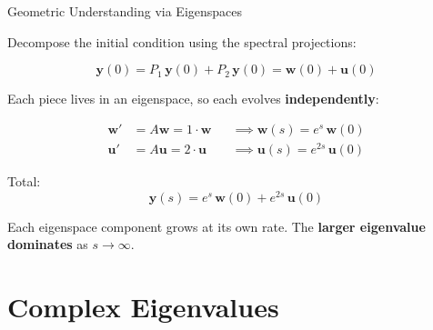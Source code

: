 \documentclass[10pt]{beamer}
\theoremstyle{definition}
\newcommand{\x}[1]{\alert{\textbf{#1}}}
\begin{document}
\begin{frame}{Geometric Understanding via Eigenspaces}

Decompose the initial condition using the spectral projections:

$$\mathbf{y}(0) = P_1\,\mathbf{y}(0) + P_2\,\mathbf{y}(0) = \mathbf{w}(0) + \mathbf{u}(0)$$

\vfill\pause

Each piece lives in an eigenspace, so each evolves \x{independently}:

\vfill

\begin{align*}
\mathbf{w}' &= A\mathbf{w} = 1 \cdot \mathbf{w} &&\implies \mathbf{w}(s) = e^{s}\,\mathbf{w}(0) \\[6pt]
\mathbf{u}' &= A\mathbf{u} = 2 \cdot \mathbf{u} &&\implies \mathbf{u}(s) = e^{2s}\,\mathbf{u}(0)
\end{align*}

\vfill\pause

Total:
$$\mathbf{y}(s) = e^s\,\mathbf{w}(0) + e^{2s}\,\mathbf{u}(0)$$

\vfill

Each eigenspace component grows at its own rate. The \x{larger eigenvalue dominates} as $s \to \infty$.

\end{frame}


\section{Complex Eigenvalues}
\end{document}
